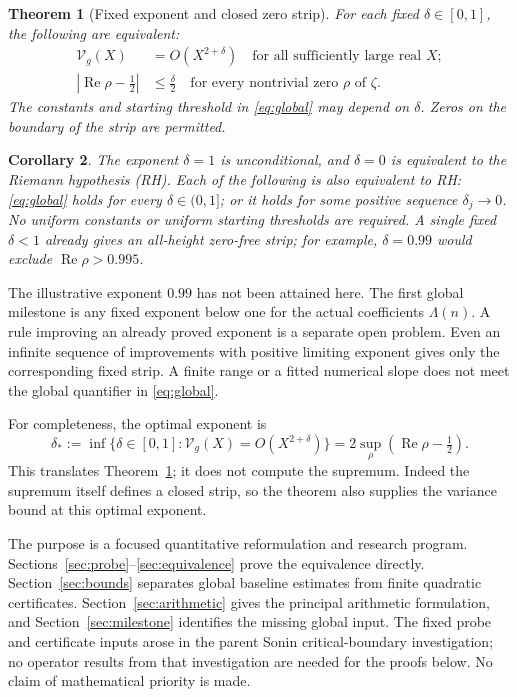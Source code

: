 \documentclass[11pt]{article}
\newtheorem{theorem}{Theorem}[section]
\newtheorem{corollary}[theorem]{Corollary}
\theoremstyle{remark}
\newcommand{\Vcal}{\mathcal V_g}
\newcommand{\Rea}{\operatorname{Re}}
\numberwithin{equation}{section}
\begin{document}
\begin{theorem}[Fixed exponent and closed zero strip]\label{thm:main}
For each fixed $\delta\in[0,1]$, the following are equivalent:
\begin{align}
\Vcal(X)&=O(X^{2+\delta})\quad\text{for all sufficiently large real }X;
\label{eq:global}\\
|\Rea\rho-\tfrac12|&\le\tfrac\delta2
\quad\text{for every nontrivial zero $\rho$ of $\zeta$}.
\label{eq:strip}
\end{align}
The constants and starting threshold in \eqref{eq:global} may depend on
$\delta$. Zeros on the boundary of the strip are permitted.
\end{theorem}

\begin{corollary}\label{cor:rh}
The exponent $\delta=1$ is unconditional, and $\delta=0$ is equivalent
to the Riemann hypothesis (RH). Each of the following is also equivalent
to RH: \eqref{eq:global} holds for every $\delta\in(0,1]$; or it holds
for some positive sequence $\delta_j\to0$. No uniform constants or
uniform starting thresholds are required. A single fixed $\delta<1$
already gives an all-height zero-free strip; for example, $\delta=0.99$
would exclude $\Rea\rho>0.995$.
\end{corollary}

The illustrative exponent $0.99$ has not been attained here. The first
global milestone is any fixed exponent below one for the actual
coefficients $\Lambda(n)$. A rule improving an already proved exponent
is a separate open problem. Even an infinite sequence of improvements
with positive limiting exponent gives only the corresponding fixed
strip. A finite range or a fitted numerical slope does not meet the
global quantifier in \eqref{eq:global}.

For completeness, the optimal exponent is
\begin{equation}\label{eq:optimal}
\delta_*:=\inf\{\delta\in[0,1]:\Vcal(X)=O(X^{2+\delta})\}
=2\sup_\rho(\Rea\rho-\tfrac12).
\end{equation}
This translates Theorem~\ref{thm:main}; it does not compute the supremum.
Indeed the supremum itself defines a closed strip, so the theorem also
supplies the variance bound at this optimal exponent.

The purpose is a focused quantitative reformulation and research
program. Sections~\ref{sec:probe}--\ref{sec:equivalence} prove the
equivalence directly. Section~\ref{sec:bounds} separates global
baseline estimates from finite quadratic certificates.
Section~\ref{sec:arithmetic} gives the principal arithmetic formulation,
and Section~\ref{sec:milestone} identifies the missing global input.
The fixed probe and certificate inputs arose in the parent
Sonin critical-boundary investigation; no operator results from that
investigation are needed for the proofs below. No claim of mathematical
priority is made.
\end{document}
